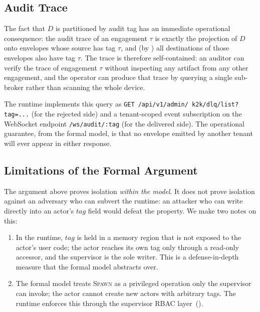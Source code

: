 \subsection{Audit Trace}
\label{sec:tenancy:audit}

The fact that \(D\) is partitioned by audit tag has an immediate
operational consequence: the audit trace of an engagement
\(\tau\) is exactly the projection of \(D\) onto envelopes whose
source has tag \(\tau\), and (by
) all destinations of those
envelopes also have tag \(\tau\).  The trace is therefore
self-contained: an auditor can verify the trace of engagement
\(\tau\) without inspecting any artifact from any other engagement,
and the operator can produce that trace by querying a single
sub-broker rather than scanning the whole device.

The runtime implements this query as
\texttt{GET\ /api/\allowbreak v1/\allowbreak admin/\allowbreak
k2k/\allowbreak dlq/\allowbreak list?tag=...}  (for the rejected
side) and a tenant-scoped event subscription on the WebSocket
endpoint \texttt{/ws/\allowbreak audit/:tag} (for the delivered
side).  The
operational guarantee, from the formal model, is that no envelope
emitted by another tenant will ever appear in either response.

\subsection{Limitations of the Formal Argument}
\label{sec:tenancy:limits}

The argument above proves isolation \emph{within the model}.  It
does not prove isolation against an adversary who can subvert the
runtime: an attacker who can write directly into an actor's
\(\mathit{tag}\) field would defeat the property.  We make two
notes on this:

\begin{enumerate}
\item In the runtime, \(\mathit{tag}\) is held in a memory region
that is not exposed to the actor's user code; the actor reaches its
own tag only through a read-only accessor, and the supervisor is
the sole writer.  This is a defense-in-depth measure that the
formal model abstracts over.

\item The formal model treats \textsc{Spawn} as a privileged
operation only the supervisor can invoke; the actor cannot create
new actors with arbitrary tags.  The runtime enforces this through
the supervisor RBAC layer~().
\end{enumerate}

